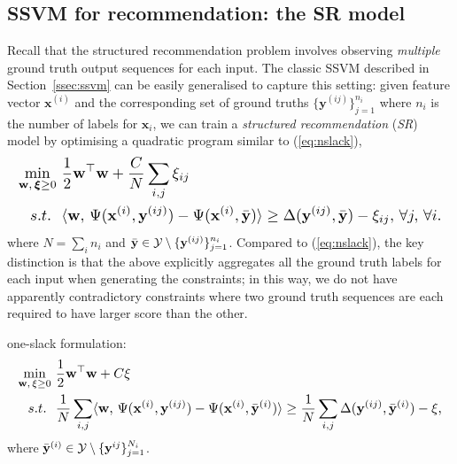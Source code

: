 \subsection{SSVM for recommendation: the SR model}
\label{ssec:sr}

Recall that the structured recommendation problem
involves observing \emph{multiple} ground truth output sequences for each input.
The classic SSVM described in Section~\ref{ssec:ssvm} can be easily generalised to capture this setting:
given feature vector $\mathbf{x}^{(i)}$ and the corresponding set of ground truths $\{\mathbf{y}^{(ij)}\}_{j=1}^{n_i}$
where $n_i$ is the number of labels for $\mathbf{x}_i$,
we can train a \emph{structured recommendation} (\emph{SR}) model by optimising a quadratic program similar to (\ref{eq:nslack}),
\begin{equation}
\label{eq:nslack_ml}
\resizebox{0.99\linewidth}{!}{$
\begin{aligned}
\min_{\mathbf{w}, \, \bm{\xi} \ge 0} ~& \frac{1}{2} \mathbf{w}^\top \mathbf{w} + \frac{C}{N} \sum_{i,j} \xi_{ij} \\
s.t.~ ~& \langle \mathbf{w}, \, \Psi(\mathbf{x}^{(i)}, \mathbf{y}^{(ij)}) - \Psi(\mathbf{x}^{(i)}, \bar{\mathbf{y}}) \rangle \ge 
         \Delta(\mathbf{y}^{(ij)}, \bar{\mathbf{y}}) - \xi_{ij}, \, \forall j, \, \forall i.
\end{aligned}
$}
\end{equation}
where $N = \sum_i n_i$ and $\bar{\mathbf{y}} \in \mathcal{Y} \setminus \{\mathbf{y}^{(ij)}\}_{j=1}^{n_i}$.
Compared to (\ref{eq:nslack}), the key distinction is that the above
explicitly aggregates all the ground truth labels for each input when generating the constraints;
in this way, we do not have apparently contradictory constraints where
two ground truth sequences are each required to have larger score than the other.

one-slack formulation:
\begin{equation}
\label{eq:1slack_ml}
\resizebox{0.99\linewidth}{!}{$
\begin{aligned}
\min_{\w, \, \xi \ge 0} ~& \frac{1}{2} \w^\top \w + C \xi \\
s.t.~ ~& \frac{1}{N} \sum_{i,j} \langle \w, \, \Psi(\x^{(i)}, \y^{(ij)}) - \Psi(\x^{(i)}, \bar{\y}^{(i)}) \rangle \ge 
         \frac{1}{N} \sum_{i,j} \Delta(\y^{(ij)}, \bar{\y}^{(i)}) - \xi, 
\end{aligned}
$}
\end{equation}
where $\bar{\mathbf{y}}^{(i)} \in \mathcal{Y} \setminus \{\mathbf{y}^{ij}\}_{j=1}^{N_i}$.


